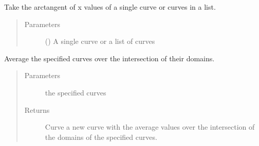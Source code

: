 \documentclass[letterpaper,10pt,english]{sphinxmanual}
\begin{document}
\begin{fulllineitems}
\label{\detokenize{pydv:pydvpy.atanx}}
Take the arctangent of x values of a single curve or curves in a list.

\begin{sphinxVerbatim}[commandchars=\\\{\}]
  
\end{sphinxVerbatim}

\begin{sphinxVerbatim}[commandchars=\\\{\}]
\end{sphinxVerbatim}
\begin{quote}\begin{description}
\item[{Parameters}] \leavevmode
{} () \textendash{} A single curve or a list of curves

\end{description}\end{quote}

\end{fulllineitems}


\begin{fulllineitems}
\label{\detokenize{pydv:pydvpy.average_curve}}
Average the specified curves over the intersection of their domains.
\begin{quote}\begin{description}
\item[{Parameters}] \leavevmode
{} \textendash{} the specified curves

\item[{Returns}] \leavevmode
Curve \textendash{} a new curve with the average values over the intersection of the domains of the specified curves.

\end{description}\end{quote}

\end{fulllineitems}
\end{document}
